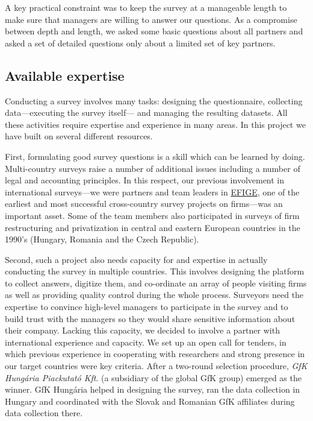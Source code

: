 \documentclass[final, dvipsnames, authoryear,12pt]{elsarticle}
\begin{document}
A key practical constraint was to keep the survey at a manageable length to make sure that managers are willing to answer our questions. As a compromise between depth and length, we asked some basic questions about all partners and asked a set of detailed questions only about a limited set of key partners. 



\subsection{Available expertise}

Conducting a survey involves many tasks: designing the questionnaire, collecting data---executing the survey itself--- and managing the resulting datasets. All these activities require expertise and experience in many areas. In this project we have built on several different resources.

First, formulating good survey questions is a skill which can be learned by doing. Multi-country surveys raise a number of additional issues including a number of legal and accounting principles. In this respect, our previous involvement in international surveys---we were partners and team leaders in \href{https://bruegel.org/publications/datasets/efige/}{EFIGE}, one of the earliest and most successful cross-country survey projects on firms---was an important asset. Some of the team members also participated in surveys of firm restructuring and privatization in central and eastern European countries in the 1990's (Hungary, Romania and the Czech Republic).

Second, such a project also needs capacity for and expertise in actually conducting the survey in multiple countries. This involves designing the platform to collect answers, digitize them, and co-ordinate an array of people visiting firms as well as providing quality control during the whole process. Surveyors need the expertise to convince high-level managers to participate in the survey and to build trust with the managers so they would share sensitive information about their company. Lacking this  capacity, we decided to involve a partner with international experience and capacity. We set up an open call for tenders, in which previous experience in cooperating with researchers and strong presence in our target countries were key criteria. After a two-round selection procedure, \emph{GfK Hungária Piackutató Kft}. (a subsidiary of the global GfK group) emerged as the winner. GfK Hungária helped in designing the survey, ran the data collection in Hungary and coordinated with the Slovak and Romanian GfK affiliates during data collection there.
\end{document}
